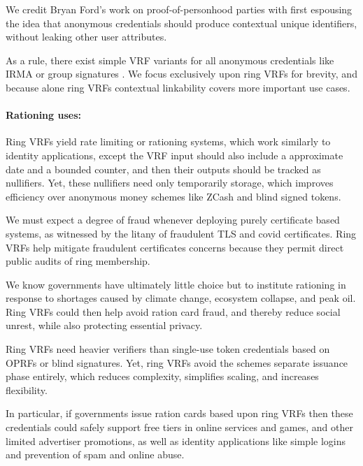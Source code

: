 We credit Bryan Ford's work on proof-of-personhood parties \cite{pop2008,pop2017}
with first espousing the idea that anonymous credentials should produce
contextual unique identifiers, without leaking other user attributes.

As a rule, there exist simple VRF variants for all anonymous credentials
like IRMA \cite{IRMA_credentials} or group signatures \cite{group_sig_survey}.
We focus exclusively upon ring VRFs for brevity, and because alone
ring VRFs contextual linkability covers more important use cases.

\paragraph{Rationing uses:}

Ring VRFs yield rate limiting or rationing systems, which work
similarly to identity applications, except the VRF input should also
include a approximate date and a bounded counter, and
 then their outputs should be tracked as nullifiers.
Yet, these nullifiers need only temporarily storage, which improves 
efficiency over anonymous money schemes like ZCash and blind signed tokens.

We must expect a degree of fraud whenever deploying purely certificate
based systems, as witnessed by the litany of fraudulent TLS and covid
certificates.  Ring VRFs help mitigate fraudulent certificates concerns
because they permit direct public audits of ring membership.

We know governments have ultimately little choice but to institute
rationing in response to shortages caused by climate change, ecosystem
collapse, and peak oil.  Ring VRFs could then help avoid ration card
fraud, and thereby reduce social unrest, while also protecting essential privacy.

Ring VRFs need heavier verifiers than single-use token credentials
based on OPRFs \cite{PrivacyPass} or blind signatures.
Yet, ring VRFs avoid the schemes separate issuance phase entirely,
which reduces complexity, simplifies scaling, and increases flexibility.

In particular, if governments issue ration cards based upon ring VRFs
then these credentials could safely support free tiers in online services
and games, and other limited advertiser promotions, as well as identity
applications like simple logins and prevention of spam and online abuse.

